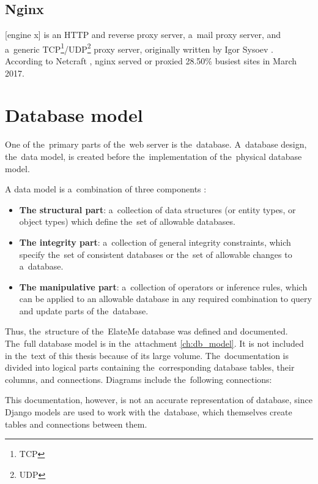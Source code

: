 \subsection{Nginx}
 [engine x] is an \ac{HTTP} and reverse proxy server, a~mail proxy server, and a~generic
\acs{TCP}\footnote{\ac{TCP}}/\acs{UDP}\footnote{\ac{UDP}} proxy server, originally written by Igor Sysoev \cite{nginx}.
According to Netcraft \cite{netcraft}, nginx served or proxied 28.50\% busiest sites in March 2017.


\newcommand{\dbpart}[1]{
\item \textbf{#1}}
\section{Database model}
One of the~primary parts of the~web server is the~database. A~database design, the~data model, is created before
the~implementation of the~physical database model.

A data model is a~combination of three components \cite{dbmodel}:

\begin{itemize}
\dbpart{The structural part}: a~collection of data structures (or entity types, or object types) which define the~set of
allowable databases.
\dbpart{The integrity part}: a~collection of general integrity constraints, which specify the~set of consistent
databases or the~set of allowable changes to a~database.
\dbpart{The manipulative part}: a~collection of operators or inference rules, which can be applied to an allowable
database in any required combination to query and update parts of the~database.
\end{itemize}

Thus, the~structure of the~ElateMe database was defined and documented. The~full database model is in the~attachment
\ref{ch:db_model}. It is not included in the~text of this thesis because of its large volume. The~documentation is
divided into logical parts containing the~corresponding database tables, their columns, and connections. Diagrams
include the~following connections:


This documentation, however, is not an accurate representation of  database, since Django models are
used to work with the~database, which themselves create tables and connections between them.
\pagebreak

